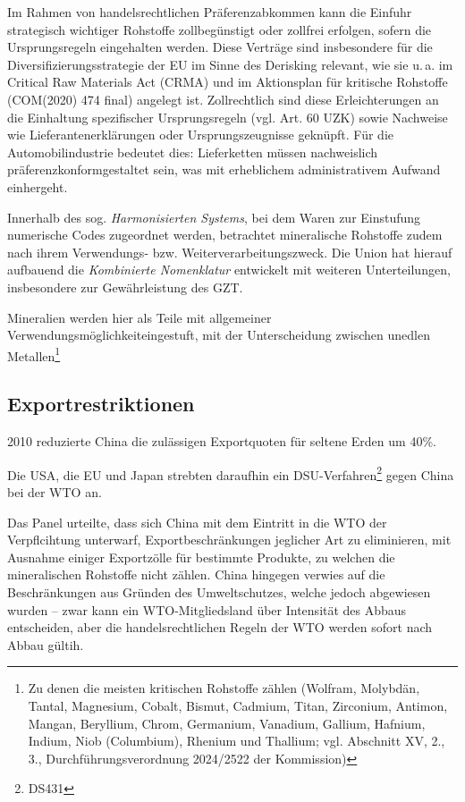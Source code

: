 \documentclass[12pt,a4paper,oneside]{book} %
\begin{document}
{%

Im Rahmen von handelsrechtlichen Präferenzabkommen kann die Einfuhr strategisch wichtiger Rohstoffe zollbegünstigt oder zollfrei erfolgen, sofern die Ursprungsregeln eingehalten werden. Diese Verträge sind insbesondere für die Diversifizierungsstrategie der EU im Sinne des Derisking relevant, wie sie u. a. im Critical Raw Materials Act (CRMA) und im Aktionsplan für kritische Rohstoffe (COM(2020) 474 final) angelegt ist. Zollrechtlich sind diese Erleichterungen an die Einhaltung spezifischer Ursprungsregeln (vgl. Art. 60 UZK) sowie Nachweise wie Lieferantenerklärungen oder Ursprungszeugnisse geknüpft. Für die Automobilindustrie bedeutet dies: Lieferketten müssen nachweislich \glqq präferenzkonform\grqq gestaltet sein, was mit erheblichem administrativem Aufwand einhergeht.

Innerhalb des sog. \textit{Harmonisierten Systems}, bei dem Waren zur Einstufung numerische Codes zugeordnet werden, betrachtet mineralische Rohstoffe zudem nach ihrem Verwendungs- bzw. Weiterverarbeitungszweck. Die Union hat hierauf aufbauend die \textit{Kombinierte Nomenklatur} entwickelt mit weiteren Unterteilungen, insbesondere zur Gewährleistung des GZT.

Mineralien werden hier als \glqq Teile mit allgemeiner Verwendungsmöglichkeit\grqq eingestuft, mit der Unterscheidung zwischen \glqq unedlen Metallen\grqq\footnote{Zu denen die meisten kritischen Rohstoffe zählen (Wolfram, Molybdän, Tantal, Magnesium, Cobalt, Bismut, Cadmium, Titan, Zirconium, Antimon, Mangan, Beryllium, Chrom, Germanium, Vanadium, Gallium, Hafnium, Indium, Niob (Columbium), Rhenium und Thallium; vgl. Abschnitt XV, 2., 3., Durchführungsverordnung 2024/2522 der Kommission)}

	
	\subsection{Exportrestriktionen}
	
	2010 reduzierte China die zulässigen Exportquoten für seltene Erden um 40\%.
	
	Die USA, die EU und Japan strebten daraufhin ein DSU-Verfahren\footnote{DS431}  gegen China bei der WTO an.\autocite{EuZW 2012, 286}
	
	Das Panel urteilte, dass sich China mit dem Eintritt in die WTO der Verpflcihtung unterwarf, Exportbeschränkungen jeglicher Art zu eliminieren, mit Ausnahme einiger Exportzölle für bestimmte Produkte, zu welchen die mineralischen Rohstoffe nicht zählen. China hingegen verwies auf die Beschränkungen aus Gründen des Umweltschutzes, welche jedoch abgewiesen wurden -- zwar kann ein WTO-Mitgliedsland über Intensität des Abbaus entscheiden, aber die handelsrechtlichen Regeln der WTO werden sofort nach Abbau gültih.\autocites{EuZW 2014, 684}{EuZW 2014, 283}
	
}
\end{document}
